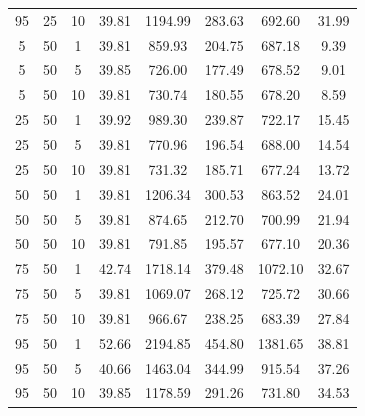 \begin{table}[H]
\begin{tabular}{ccc|c|c|c|c|c}
95 & 25 & 10 & \cellcolor{gray!80}39.81 & \cellcolor{gray!2}1194.99 & \cellcolor{gray!1}283.63 & \cellcolor{gray!70}692.60 & 31.99\\
5 & 50 & 1 & \cellcolor{gray!80}39.81 & \cellcolor{gray!58}859.93 & \cellcolor{gray!54}204.75 & \cellcolor{gray!72}687.18 & 9.39\\
5 & 50 & 5 & \cellcolor{gray!80}39.85 & \cellcolor{gray!80}726.00 & \cellcolor{gray!80}177.49 & \cellcolor{gray!75}678.52 & 9.01\\
5 & 50 & 10 & \cellcolor{gray!80}39.81 & \cellcolor{gray!80}730.74 & \cellcolor{gray!77}180.55 & \cellcolor{gray!75}678.20 & 8.59\\
25 & 50 & 1 & \cellcolor{gray!79}39.92 & \cellcolor{gray!37}989.30 & \cellcolor{gray!21}239.87 & \cellcolor{gray!61}722.17 & 15.45\\
25 & 50 & 5 & \cellcolor{gray!80}39.81 & \cellcolor{gray!73}770.96 & \cellcolor{gray!62}196.54 & \cellcolor{gray!72}688.00 & 14.54\\
25 & 50 & 10 & \cellcolor{gray!80}39.81 & \cellcolor{gray!80}731.32 & \cellcolor{gray!72}185.71 & \cellcolor{gray!75}677.24 & 13.72\\
50 & 50 & 1 & \cellcolor{gray!80}39.81 & \cellcolor{gray!1}1206.34 & \cellcolor{gray!1}300.53 & \cellcolor{gray!18}863.52 & 24.01\\
50 & 50 & 5 & \cellcolor{gray!80}39.81 & \cellcolor{gray!56}874.65 & \cellcolor{gray!47}212.70 & \cellcolor{gray!68}700.99 & 21.94\\
50 & 50 & 10 & \cellcolor{gray!80}39.81 & \cellcolor{gray!70}791.85 & \cellcolor{gray!63}195.57 & \cellcolor{gray!75}677.10 & 20.36\\
75 & 50 & 1 & \cellcolor{gray!51}42.74 & \cellcolor{gray!1}1718.14 & \cellcolor{gray!1}379.48 & \cellcolor{gray!1}1072.10 & 32.67\\
75 & 50 & 5 & \cellcolor{gray!80}39.81 & \cellcolor{gray!23}1069.07 & \cellcolor{gray!1}268.12 & \cellcolor{gray!60}725.72 & 30.66\\
75 & 50 & 10 & \cellcolor{gray!80}39.81 & \cellcolor{gray!40}966.67 & \cellcolor{gray!23}238.25 & \cellcolor{gray!73}683.39 & 27.84\\
95 & 50 & 1 & \cellcolor{gray!1}52.66 & \cellcolor{gray!1}2194.85 & \cellcolor{gray!1}454.80 & \cellcolor{gray!1}1381.65 & 38.81\\
95 & 50 & 5 & \cellcolor{gray!72}40.66 & \cellcolor{gray!1}1463.04 & \cellcolor{gray!1}344.99 & \cellcolor{gray!2}915.54 & 37.26\\
95 & 50 & 10 & \cellcolor{gray!80}39.85 & \cellcolor{gray!5}1178.59 & \cellcolor{gray!1}291.26 & \cellcolor{gray!58}731.80 & 34.53\\

\end{tabular}
\end{table}
